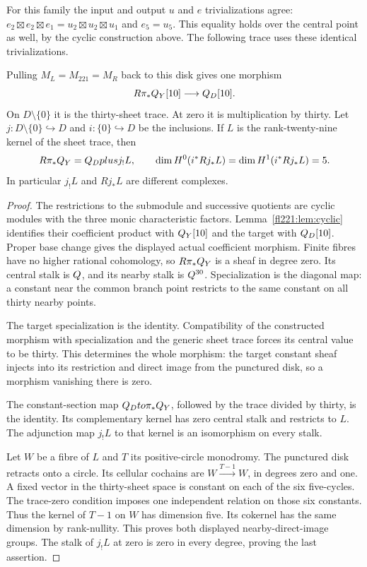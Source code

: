 For this family the input and output $u$ and $e$ trivializations agree:
$e_2\boxtimes e_2\boxtimes e_1=u_2\boxtimes u_2\boxtimes u_1$
and $e_5=u_5$. This equality holds over the central point as well,
by the cyclic construction above. The following trace uses these
identical trivializations.

\begin{proposition}
\label{fl221:prop:gluing}
Pulling $M_L=M_{221}=M_R$ back to this disk gives one morphism
\[
                   R\pi_*Q_Y[10]\longrightarrow Q_D[10].
\]
On $D\setminus\{0\}$ it is the thirty-sheet trace. At zero it is
multiplication by thirty. Let $j:D\setminus\{0\}\hookrightarrow D$
and $i:\{0\}\hookrightarrow D$ be the inclusions.
If $L$ is the rank-twenty-nine kernel of the sheet trace, then
\[
 R\pi_*Q_Y=Q_Dplus j_!L,
 \qquad
 \dim H^0(i^*Rj_*L)=\dim H^1(i^*Rj_*L)=5.
\]
In particular $j_!L$ and $Rj_*L$ are different complexes.
\end{proposition}

\begin{proof}
The restrictions to the submodule and successive quotients are
cyclic modules with the three monic characteristic factors.
Lemma~\ref{fl221:lem:cyclic} identifies their coefficient product
with $Q_Y[10]$ and the target with $Q_D[10]$.
Proper base change gives the displayed actual coefficient morphism.
Finite fibres have no higher rational cohomology, so $R\pi_*Q_Y$
is a sheaf in degree zero. Its central stalk is $Q$, and its
nearby stalk is $Q^{30}$. Specialization is the diagonal map:
a constant near the common branch point restricts to the same
constant on all thirty nearby points.

The target specialization is the identity. Compatibility of the
constructed morphism with specialization and the generic sheet
trace forces its central value to be thirty. This determines the
whole morphism: the target constant sheaf injects into its restriction
and direct image from the punctured disk, so a morphism vanishing
there is zero.

The constant-section map $Q_Dto\pi_*Q_Y$, followed by the
trace divided by thirty, is the identity. Its complementary kernel
has zero central stalk and restricts to $L$. The adjunction map
$j_!L$ to that kernel is an isomorphism on every stalk.

Let $W$ be a fibre of $L$ and $T$ its positive-circle monodromy.
The punctured disk retracts onto a circle. Its cellular cochains
are $W\xrightarrow{T-1}W$, in degrees zero and one.
A fixed vector in the thirty-sheet space is constant on each of
the six five-cycles. The trace-zero condition imposes one independent
relation on those six constants. Thus the kernel of $T-1$ on $W$
has dimension five. Its cokernel has the same dimension by
rank-nullity. This proves both displayed nearby-direct-image groups.
The stalk of $j_!L$ at zero is zero in every degree, proving the
last assertion.
\end{proof}

